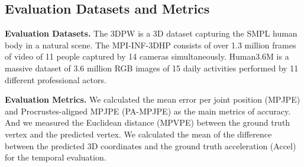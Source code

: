 \documentclass{bmvc2k}
\begin{document}
\subsection{Evaluation Datasets and Metrics}
\textbf{Evaluation Datasets.}
The 3DPW\cite{von2018recovering} is a 3D dataset capturing the SMPL human body in a natural scene. The MPI-INF-3DHP\cite{mehta2017monocular} consists of over 1.3 million frames of video of 11 people captured by 14 cameras simultaneously. Human3.6M\cite{ionescu2013human3} is a massive dataset of 3.6 million RGB images of 15 daily activities performed by 11 different professional actors.

\textbf{Evaluation Metrics.}
We calculated the mean error per joint position (MPJPE) and Procrustes-aligned MPJPE (PA-MPJPE) as the main metrics of accuracy. And we measured the Euclidean distance (MPVPE) between the ground truth vertex and the predicted vertex. We calculated the mean of the difference between the predicted 3D coordinates and the ground truth acceleration (Accel) for the temporal evaluation.


 
\end{document}
